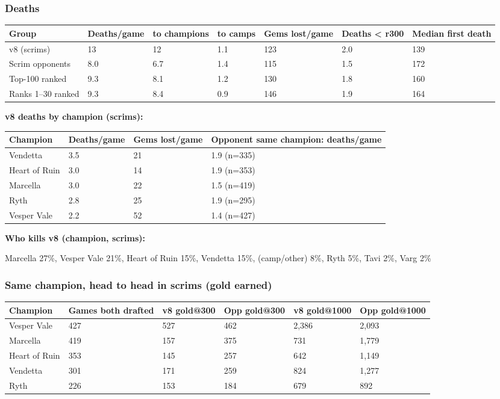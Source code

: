 \documentclass[
  10pt,
]{article}
\newcounter{none} %
\begin{document}
\subsubsection{Deaths}\label{deaths}

{\def\LTcaptype{none} %
\begin{longtable}[]{@{}lllllll@{}}
\toprule\noalign{}
Group & Deaths/game & to champions & to camps & Gems lost/game & Deaths
\textless{} r300 & Median first death \\
\midrule\noalign{}
\endhead
\bottomrule\noalign{}
\endlastfoot
v8 (scrims) & 13 & 12 & 1.1 & 123 & 2.0 & 139 \\
Scrim opponents & 8.0 & 6.7 & 1.4 & 115 & 1.5 & 172 \\
Top-100 ranked & 9.3 & 8.1 & 1.2 & 130 & 1.8 & 160 \\
Ranks 1--30 ranked & 9.3 & 8.4 & 0.9 & 146 & 1.9 & 164 \\
\end{longtable}
}

\textbf{v8 deaths by champion (scrims):}

{\def\LTcaptype{none} %
\begin{longtable}[]{@{}llll@{}}
\toprule\noalign{}
Champion & Deaths/game & Gems lost/game & Opponent same champion:
deaths/game \\
\midrule\noalign{}
\endhead
\bottomrule\noalign{}
\endlastfoot
Vendetta & 3.5 & 21 & 1.9 (n=335) \\
Heart of Ruin & 3.0 & 14 & 1.9 (n=353) \\
Marcella & 3.0 & 22 & 1.5 (n=419) \\
Ryth & 2.8 & 25 & 1.9 (n=295) \\
Vesper Vale & 2.2 & 52 & 1.4 (n=427) \\
\end{longtable}
}

\textbf{Who kills v8 (champion, scrims):}

Marcella 27\%, Vesper Vale 21\%, Heart of Ruin 15\%, Vendetta 15\%,
(camp/other) 8\%, Ryth 5\%, Tavi 2\%, Varg 2\%

\subsubsection{Same champion, head to head in scrims (gold
earned)}\label{same-champion-head-to-head-in-scrims-gold-earned}

{\def\LTcaptype{none} %
\begin{longtable}[]{@{}llllll@{}}
\toprule\noalign{}
Champion & Games both drafted & v8 gold@300 & Opp gold@300 & v8
gold@1000 & Opp gold@1000 \\
\midrule\noalign{}
\endhead
\bottomrule\noalign{}
\endlastfoot
Vesper Vale & 427 & 527 & 462 & 2,386 & 2,093 \\
Marcella & 419 & 157 & 375 & 731 & 1,779 \\
Heart of Ruin & 353 & 145 & 257 & 642 & 1,149 \\
Vendetta & 301 & 171 & 259 & 824 & 1,277 \\
Ryth & 226 & 153 & 184 & 679 & 892 \\
\end{longtable}
}
\end{document}
